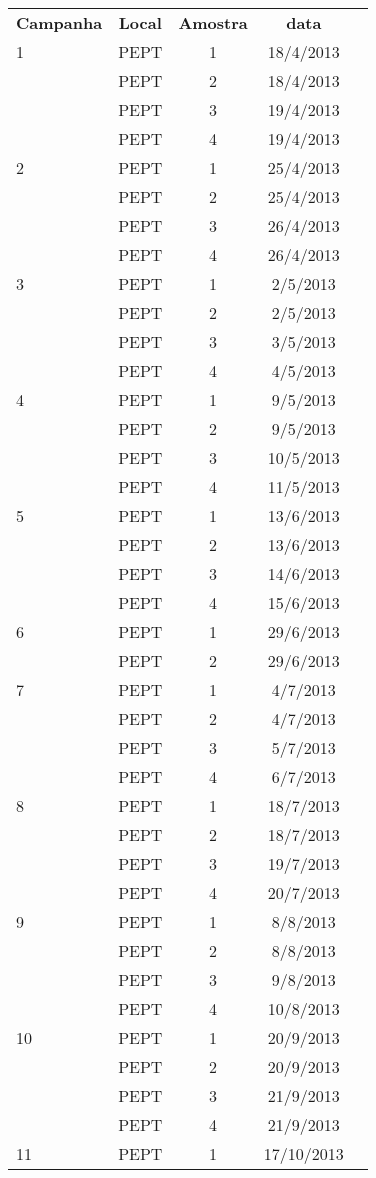 \begin{tabular}{lcccc}

\textbf{Campanha} & \textbf{Local} & \textbf{Amostra} & \textbf{data} \\

1 & PEPT & 1 & 18/4/2013 \\
  & PEPT & 2 & 18/4/2013\\
  & PEPT & 3 & 19/4/2013\\
 &PEPT&4&19/4/2013\\
2&PEPT&1&25/4/2013\\
&PEPT&2&25/4/2013\\
&PEPT&3&26/4/2013\\
&PEPT&4&26/4/2013\\
3&PEPT&1&2/5/2013\\
&PEPT&2&2/5/2013\\
&PEPT&3&3/5/2013\\
&PEPT&4&4/5/2013\\
4&PEPT&1&9/5/2013\\
&PEPT&2&9/5/2013\\
&PEPT&3&10/5/2013\\
&PEPT&4&11/5/2013\\
5&PEPT&1&13/6/2013\\
&PEPT&2&13/6/2013\\
&PEPT&3&14/6/2013\\
&PEPT&4&15/6/2013\\
6&PEPT&1&29/6/2013\\
&PEPT&2&29/6/2013\\
7&PEPT&1&4/7/2013\\
&PEPT&2&4/7/2013\\
&PEPT&3&5/7/2013\\
&PEPT&4&6/7/2013\\
8&PEPT&1&18/7/2013\\
&PEPT&2&18/7/2013\\
&PEPT&3&19/7/2013\\
&PEPT&4&20/7/2013\\
9&PEPT&1&8/8/2013\\
&PEPT&2&8/8/2013\\
&PEPT&3&9/8/2013\\
&PEPT&4&10/8/2013\\
10&PEPT&1&20/9/2013\\
&PEPT&2&20/9/2013\\
&PEPT&3&21/9/2013\\
&PEPT&4&21/9/2013\\
11&PEPT&1&17/10/2013\\

\end{tabular}

